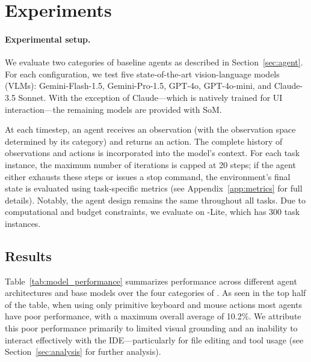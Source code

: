 \section{Experiments}
\label{sec:experiments}





\paragraph{Experimental setup.}

We evaluate two categories of baseline agents as described in Section~\ref{sec:agent}.
For each configuration, we test five state-of-the-art vision-language models (VLMs): Gemini-Flash-1.5, Gemini-Pro-1.5, GPT-4o, GPT-4o-mini, and Claude-3.5 Sonnet.
With the exception of Claude—which is natively trained for UI interaction—the remaining models are provided with SoM.

At each timestep, an agent receives an observation (with the observation space determined by its category) and returns an action.
The complete history of observations and actions is incorporated into the model's context.
For each task instance, the maximum number of iterations is capped at 20 steps; if the agent either exhausts these steps or issues a stop command, the environment's final state is evaluated using task-specific metrics (see Appendix~\ref{app:metrics} for full details).
Notably, the agent design remains the same throughout all tasks.
Due to computational and budget constraints, we evaluate on \bench{}-Lite, which has 300 task instances.

\subsection{Results}





Table~\ref{tab:model_performance} summarizes performance across different agent architectures and base models over the four categories of \bench{}.
As seen in the top half of the table, when using only primitive keyboard and mouse actions most agents have poor performance, with a maximum overall average of 10.2\%.
We attribute this poor performance primarily to limited visual grounding and an inability to interact effectively with the IDE—particularly for file editing and tool usage (see Section~\ref{sec:analysis} for further analysis).

